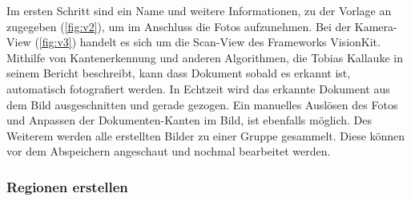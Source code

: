 \documentclass[nomenclature, oneside, 150]{HSMW-Thesis}
\begin{document}
			Im ersten Schritt sind ein Name und weitere Informationen, zu der Vorlage an zugegeben (\ref{fig:v2}), um im Anschluss die Fotos aufzunehmen. Bei der Kamera-View (\ref{fig:v3}) handelt es sich um die Scan-View des Frameworks VisionKit. Mithilfe von Kantenerkennung und anderen Algorithmen, die Tobias Kallauke in seinem Bericht beschreibt, kann dass Dokument sobald es erkannt ist, automatisch fotografiert werden. In Echtzeit wird das erkannte Dokument aus dem Bild ausgeschnitten und gerade gezogen. Ein manuelles Auslösen des Fotos und Anpassen der Dokumenten-Kanten im Bild, ist ebenfalls möglich. Des Weiterem werden alle erstellten Bilder zu einer Gruppe gesammelt. Diese können vor dem Abspeichern angeschaut und nochmal bearbeitet werden. 
			
			\subsubsection{Regionen erstellen}
\end{document}
